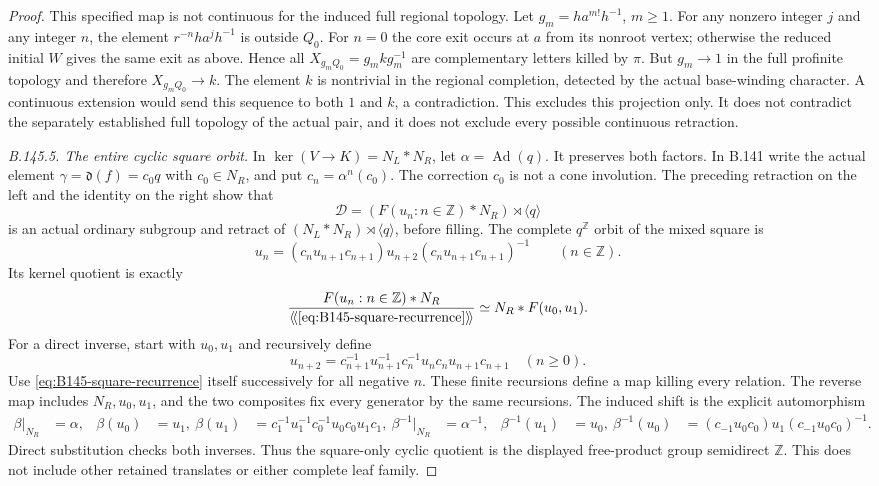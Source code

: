 \begin{proof}
This specified map is not continuous for the induced full regional
topology. Let $g_m=ha^{m!}h^{-1}$, $m\geq1$. For any nonzero
integer $j$ and any integer $n$, the element
$r^{-n}ha^jh^{-1}$ is outside $Q_0$. For $n=0$ the core exit
occurs at $a$ from its nonroot vertex; otherwise the reduced initial
$W$ gives the same exit as above. Hence all
$X_{g_mQ_0}=g_mkg_m^{-1}$ are complementary letters killed by
$\pi$. But $g_m\to1$ in the full profinite topology and therefore
$X_{g_mQ_0}\to k$. The element $k$ is nontrivial in the regional
completion, detected by the actual base-winding character. A
continuous extension would send this sequence to both $1$ and
$k$, a contradiction. This excludes this projection only. It does
not contradict the separately established full topology of the
actual pair, and it does not exclude every possible continuous
retraction.

\emph{B.145.5. The entire cyclic square orbit.}
In $\ker(V\to K)=N_L*N_R$, let $\alpha=\operatorname{Ad}(q)$.
It preserves both factors. In B.141 write the actual element
$\gamma=\mathfrak d(f)=c_0q$ with $c_0\in N_R$, and put
$c_n=\alpha^n(c_0)$. The correction $c_0$ is not a cone involution.
The preceding retraction on the left and the identity on the right
show that
\[
 \mathscr D=(F(u_n:n\in\mathbb Z)*N_R)\rtimes\langle q\rangle
\]
is an actual ordinary subgroup and retract of
$(N_L*N_R)\rtimes\langle q\rangle$, before filling.
The complete $q^{\mathbb Z}$ orbit of the mixed square is
\begin{equation}\label{eq:B145-square-recurrence}
 u_n=(c_nu_{n+1}c_{n+1})u_{n+2}
                  (c_nu_{n+1}c_{n+1})^{-1}
                  \qquad(n\in\mathbb Z).
\end{equation}
Its kernel quotient is exactly
\begin{equation}\label{eq:B145-square-normal}
 \frac{F(u_n:n\in\mathbb Z)*N_R}
 {\langle\!\langle\eqref{eq:B145-square-recurrence}
                  \rangle\!\rangle}
       \simeq N_R*F(u_0,u_1).
\end{equation}
For a direct inverse, start with $u_0,u_1$ and recursively define
\[
 u_{n+2}=c_{n+1}^{-1}u_{n+1}^{-1}c_n^{-1}u_n
                      c_nu_{n+1}c_{n+1}\quad(n\geq0).
\]
Use \eqref{eq:B145-square-recurrence} itself successively for all
negative $n$. These finite recursions define a map killing every
relation. The reverse map includes $N_R,u_0,u_1$, and the two
composites fix every generator by the same recursions.
The induced shift is the explicit automorphism
\begin{equation}\label{eq:B145-beta}
\begin{aligned}
 \beta|_{N_R}&=\alpha,& \beta(u_0)&=u_1,\
 \beta(u_1)&=c_1^{-1}u_1^{-1}c_0^{-1}u_0c_0u_1c_1,\
 \beta^{-1}|_{N_R}&=\alpha^{-1},&\beta^{-1}(u_1)&=u_0,\
 \beta^{-1}(u_0)&=(c_{-1}u_0c_0)u_1(c_{-1}u_0c_0)^{-1}.
\end{aligned}
\end{equation}
Direct substitution checks both inverses. Thus the square-only
cyclic quotient is the displayed free-product group semidirect
$\mathbb Z$. This does not include other retained translates or
either complete leaf family.


\end{proof}
